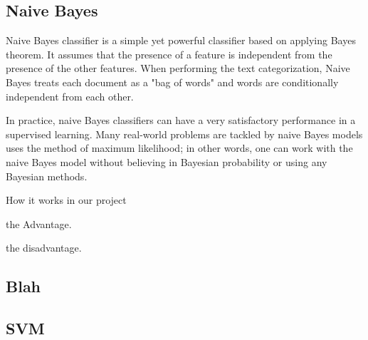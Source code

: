 
\subsection{Naive Bayes}
Naive Bayes \cite{NaiveBayes} classifier is a simple yet powerful classifier based on applying Bayes theorem. It assumes that the presence of a feature is independent from the presence of the other features. When performing the text categorization, Naive Bayes treats each document as a "bag of words" and words are conditionally independent from each other.

In practice, naive Bayes classifiers can have a very satisfactory performance in a supervised learning. Many real-world problems are tackled by naive Bayes models uses the method of maximum likelihood; in other words, one can work with the naive Bayes model without believing in Bayesian probability or using any Bayesian methods.


How it works in our project

the Advantage.

the disadvantage.
\subsection{Blah}
\subsection{SVM}
